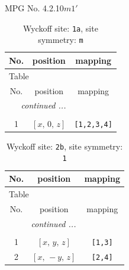 \documentclass[fleqn,8pt]{jsarticle}
\begin{document}
\setcounter{MaxMatrixCols}{32}

\renewcommand{\tablename}{Table~}
\renewcommand{\figurename}{Figure~}
\begin{center}
\LARGE
MPG No. 4.2.10\quad$m1'$
\end{center}
\renewcommand{\arraystretch}{1.2}
\begin{longtable}{ccc}
\caption{Wyckoff site: {\tt 1a}, site symmetry: {\tt m}}
 \\
 \hline \hline
No. & position & mapping \\ \hline \endfirsthead

\multicolumn{2}{l}{\tablename\ \thetable{}} \\
 \hline \hline
No. & position & mapping \\ \hline \endhead

 \hline \hline
\multicolumn{2}{r}{\footnotesize\it continued ...} \\ \endfoot

 \hline \hline
\multicolumn{2}{r}{} \\ \endlastfoot

1 & $\left[ x,\, 0,\, z \right]$ & {\tt [1,2,3,4]} \\
\end{longtable}
\renewcommand{\arraystretch}{1.2}
\begin{longtable}{ccc}
\caption{Wyckoff site: {\tt 2b}, site symmetry: {\tt 1}}
 \\
 \hline \hline
No. & position & mapping \\ \hline \endfirsthead

\multicolumn{2}{l}{\tablename\ \thetable{}} \\
 \hline \hline
No. & position & mapping \\ \hline \endhead

 \hline \hline
\multicolumn{2}{r}{\footnotesize\it continued ...} \\ \endfoot

 \hline \hline
\multicolumn{2}{r}{} \\ \endlastfoot

1 & $\left[ x,\, y,\, z \right]$ & {\tt [1,3]} \\ \hline
2 & $\left[ x,\, - y,\, z \right]$ & {\tt [2,4]} \\
\end{longtable}
\end{document}
